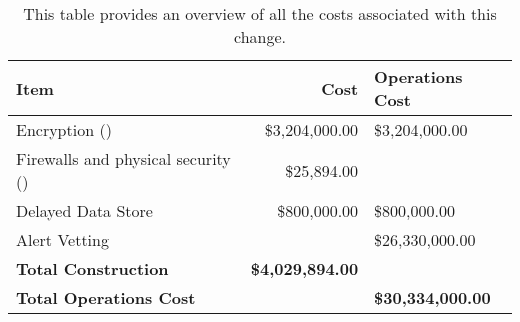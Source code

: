 \tiny \begin{longtable} {|l|r|} \caption{This table provides an overview of all the costs associated with this change.  \label{tab:totalcost}}\\ 
\hline 
\textbf{Item }&\textbf{Cost }&\textbf{Operations Cost} \\ \hline
{Encryption ()}&{\$3,204,000.00}&{\$3,204,000.00} \\ \hline
{Firewalls and physical security ()}&{\$25,894.00}& \\ \hline
{Delayed Data Store}&{\$800,000.00}&{\$800,000.00} \\ \hline
{Alert Vetting}&{}&{\$26,330,000.00} \\ \hline
\textbf{Total Construction}&\textbf{\$4,029,894.00}& \\ \hline
\textbf{Total Operations Cost}&\textbf{}&\textbf{\$30,334,000.00} \\ \hline
\end{longtable} \normalsize
